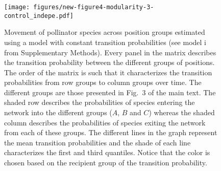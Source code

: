 \documentclass[11pt, a4paper]{article}
\begin{document}
\clearpage

\begin{figure}[p]
  \centering
    \vspace{0.5cm}
    \texttt{[image: figures/new-figure4-modularity-3-control\_indepe.pdf]}
	  \vspace{0.5cm}
	   \caption[Movement of pollinator species across position groups estimated using a model with constant transition probabilities]{Movement of pollinator species across position groups estimated using a model with constant transition probabilities (see model i from Supplementary Methods). Every panel in the matrix describes the transition probability between the different groups of positions. The order of the matrix is such that it characterizes the transition probabilities from row groups to column groups over time. The different groups are those presented in Fig.~3 of the main text. The shaded row describes the probabilities of species entering the network into the different groups ($A$, $B$ and $C$) whereas the shaded column describes the probabilities of species exiting the network from each of these groups. The different lines in the graph represent the mean transition probabilities and the shade of each line characterizes the first and third quantiles. Notice that the color is chosen based on the recipient group of the transition probability.}
      \label{sfig:dynamics-constant}
\end{figure}

\clearpage

\end{document}
